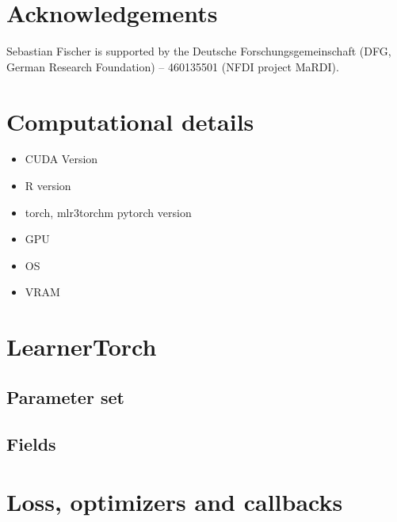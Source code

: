 \documentclass[article]{jss}
\theoremstyle{definition}
\begin{document}
\section*{Acknowledgements}

Sebastian Fischer is supported by the Deutsche Forschungsgemeinschaft (DFG, German Research Foundation) – 460135501 (NFDI project MaRDI).



\begin{appendix}

\section{Computational details}\label{app:comp-details}

\begin{itemize}
    \item CUDA Version
    \item R version
    \item torch, mlr3torchm pytorch version
    \item GPU
    \item OS
    \item VRAM
\end{itemize}

\section{LearnerTorch}

\subsection{Parameter set}\label{app:learner_ps}
\subsection{Fields}\label{app:learner_fields}

\section{Loss, optimizers and callbacks}\label{app:loss_opts_cbs}

\end{appendix}
\end{document}
